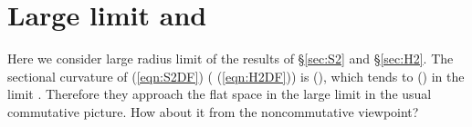 \documentclass[12pt,a4paper]{article}
\begin{document}
\section{Large \coordHE{} limit and \coordHE{}}

Here we consider large radius limit of the results of \S\ref{sec:S2}
and \S\ref{sec:H2}.
The sectional curvature of \coordHE{} (\ref{eqn:S2DF})
(\coordHE{} (\ref{eqn:H2DF})) is \coordHE{} (\coordHE{}),
which tends to \coordHE{} (\coordHE{}) in the limit \coordHE{}.
Therefore they approach the flat space \coordHE{} in the large
\coordHE{} limit in the usual commutative picture.
How about it from the noncommutative viewpoint?
\end{document}
